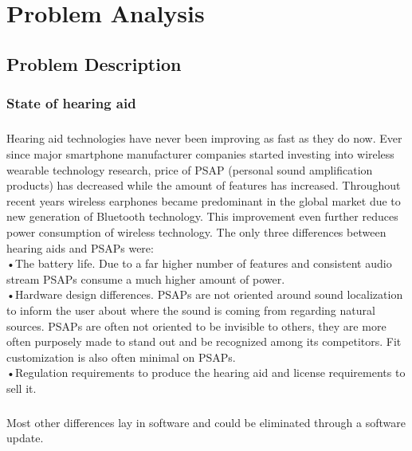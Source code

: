 \chapter{Problem Analysis}\label{ProblemAnalysis}
\section{Problem Description}
\subsection{State of hearing aid}
\paragraph{}
Hearing aid technologies have never been improving as fast as they do now. Ever since major smartphone manufacturer companies started investing into wireless wearable technology research, price of PSAP (personal sound amplification products) has decreased while the amount of features has increased. Throughout recent years wireless earphones became predominant in the global market due to new generation of Bluetooth technology. This improvement even further reduces power consumption of wireless technology. The only three differences between hearing aids and PSAPs were: \\

•The battery life. Due to a far higher number of features and consistent audio stream PSAPs consume a much higher amount of power.\\

•Hardware design differences. PSAPs are not oriented around sound localization to inform the user about where the sound is coming from regarding natural sources. PSAPs are often not oriented to be invisible to others, they are more often purposely made to stand out and be recognized among its competitors. Fit customization is also often minimal on PSAPs.\\

•Regulation requirements to produce the hearing aid and license requirements to sell it.

\paragraph{} 
Most other differences lay in software and could be eliminated through a software update.
